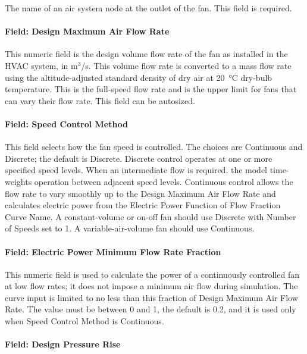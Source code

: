 The name of an air system node at the outlet of the fan. This field is required.

\paragraph{Field: Design Maximum Air Flow Rate}\label{field-design-air-flow-fansysmodel}

This numeric field is the design volume flow rate of the fan as installed in the HVAC system, in m\(^{3}\)/s. This volume flow rate is converted to a mass flow rate using the altitude-adjusted standard density of dry air at \SI{20}{\celsius} dry-bulb temperature. This is the full-speed flow rate and is the upper limit for fans that can vary their flow rate. This field can be autosized.

\paragraph{Field: Speed Control Method}\label{field-speed-method-fansysmodel}

This field selects how the fan speed is controlled. The choices are Continuous and Discrete; the default is Discrete. Discrete control operates at one or more specified speed levels. When an intermediate flow is required, the model time-weights operation between adjacent speed levels. Continuous control allows the flow rate to vary smoothly up to the Design Maximum Air Flow Rate and calculates electric power from the Electric Power Function of Flow Fraction Curve Name. A constant-volume or on-off fan should use Discrete with Number of Speeds set to 1. A variable-air-volume fan should use Continuous.

\paragraph{Field: Electric Power Minimum Flow Rate Fraction}\label{field-power-min-flow-fraction-fansysmodel}

This numeric field is used to calculate the power of a continuously controlled fan at low flow rates; it does not impose a minimum air flow during simulation. The curve input is limited to no less than this fraction of Design Maximum Air Flow Rate. The value must be between 0 and 1, the default is 0.2, and it is used only when Speed Control Method is Continuous.

\paragraph{Field: Design Pressure Rise}\label{field-pressure-fansysmodel}

